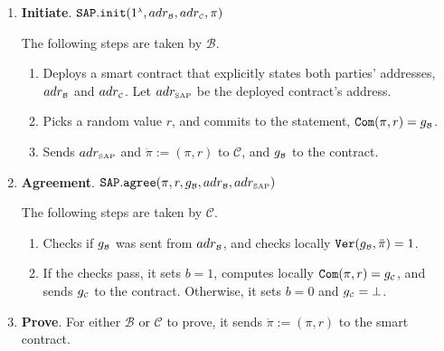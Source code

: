 %
 \begin{enumerate}
 \item\textbf{Initiate}. $\mathtt{SAP.init}(1^{\scriptscriptstyle\lambda}, adr_{\scriptscriptstyle\mathcal{B}}, adr_{\scriptscriptstyle\mathcal{C}}, \pi )$ 

 The following steps are taken   by  $\mathcal B$.
 
  \begin{enumerate}
  \item\label{SAP::deploy-contract}  Deploys a smart contract that  explicitly states both parties'  addresses, $adr_{\scriptscriptstyle\mathcal{B}}$ and  $adr_{\scriptscriptstyle\mathcal{C}}$. Let $adr_{\scriptscriptstyle\text{SAP}}$ be the deployed contract's address. 

   \item  Picks a random value $r$, and commits to the statement, $\mathtt{Com}(\pi, r)=g_{\scriptscriptstyle \mathcal{B}}$.
   \item Sends $adr_{\scriptscriptstyle\text{SAP}}$ and $\ddot{\pi}:=(\pi, r)$  to  $\mathcal C$, and $g_{\scriptscriptstyle\mathcal B}$ to the contract. 
    \end{enumerate}
     
     \vspace{1mm}
     
    \item\textbf{Agreement}. $\mathtt{SAP.agree}(\pi, r, g_{\scriptscriptstyle \mathcal{B}}, adr_{\scriptscriptstyle\mathcal{B}}, adr_{\scriptscriptstyle\text{SAP}})$

     The following steps are taken   by  $\mathcal C$.
     \begin{enumerate}
   \item Checks  if $g_{\scriptscriptstyle \mathcal{B}}$ was  sent  from $adr_{\scriptscriptstyle \mathcal{B}}$, and checks locally $\mathtt{Ver}(g_{\scriptscriptstyle\mathcal B}, \ddot{\pi})=1$.
   \item If the checks pass, it sets $b=1$,    computes locally $\mathtt{Com}(\pi, r)=g_{\scriptscriptstyle\mathcal C}$, and sends $g_{\scriptscriptstyle\mathcal C}$ to the contract. Otherwise, it sets $b=0$ and $g_{\scriptscriptstyle\mathcal C}=\bot$.
    \end{enumerate}
     
          \vspace{1mm}
     
   \item\textbf{Prove}. For either $\mathcal B$ or $\mathcal C$ to prove, it sends $\ddot{\pi}:=(\pi, r)$  to the smart contract. 
   

\end{enumerate}
